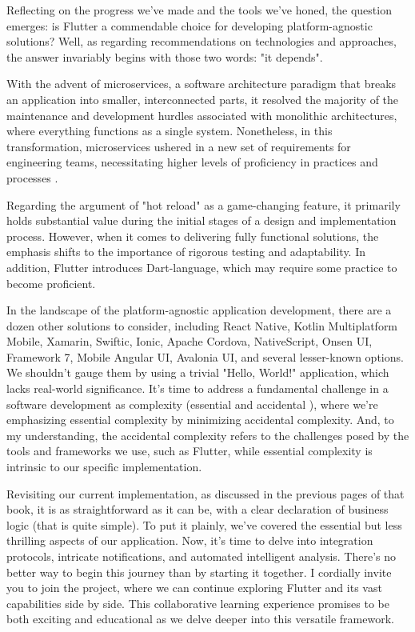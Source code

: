 
Reflecting on the progress we've made and the tools we've honed, the question emerges: is Flutter a commendable 
choice for developing platform-agnostic solutions? Well, as regarding recommendations on technologies and approaches, 
the answer invariably begins with those two words: "it depends".

With the advent of microservices, a software architecture paradigm that breaks an application into smaller, 
interconnected parts, it resolved the majority of the maintenance and development hurdles associated with monolithic 
architectures, where everything functions as a single system. Nonetheless, in this transformation, microservices 
ushered in a new set of requirements for engineering teams, necessitating higher levels of proficiency in practices 
and processes \cite{Mugr23}.

Regarding the argument of "hot reload" as a game-changing feature, it primarily holds substantial value during the 
initial stages of a design and implementation process. However, when it comes to delivering fully functional solutions, 
the emphasis shifts to the importance of rigorous testing and adaptability. In addition, Flutter introduces 
Dart-language, which may require some practice to become proficient.

In the landscape of the platform-agnostic application development, there are a dozen other solutions to consider, 
including React Native, Kotlin Multiplatform Mobile, Xamarin, Swiftic, Ionic, Apache Cordova, NativeScript, Onsen UI, 
Framework 7, Mobile Angular UI, Avalonia UI, and several lesser-known options. We shouldn't gauge them by using a 
trivial "Hello, World!" application, which lacks real-world significance. It's time to address a fundamental challenge 
in a software development as complexity (essential and accidental \cite{Broo87}), where we're emphasizing essential 
complexity by minimizing accidental complexity. And, to my understanding, the accidental complexity refers to the 
challenges posed by the tools and frameworks we use, such as Flutter, while essential complexity is intrinsic to our 
specific implementation.

Revisiting our current implementation, as discussed in the previous pages of that book, it is as 
straightforward as it can be, with a clear declaration of business logic (that is quite simple). To put it plainly, 
we've covered the essential but less thrilling aspects of our application. Now, it's time to delve into integration 
protocols, intricate notifications, and automated intelligent analysis. There's no better way to begin this journey 
than by starting it together. I cordially invite you to join the project, where we can continue exploring Flutter and 
its vast capabilities side by side. This collaborative learning experience promises to be both exciting and educational 
as we delve deeper into this versatile framework.
